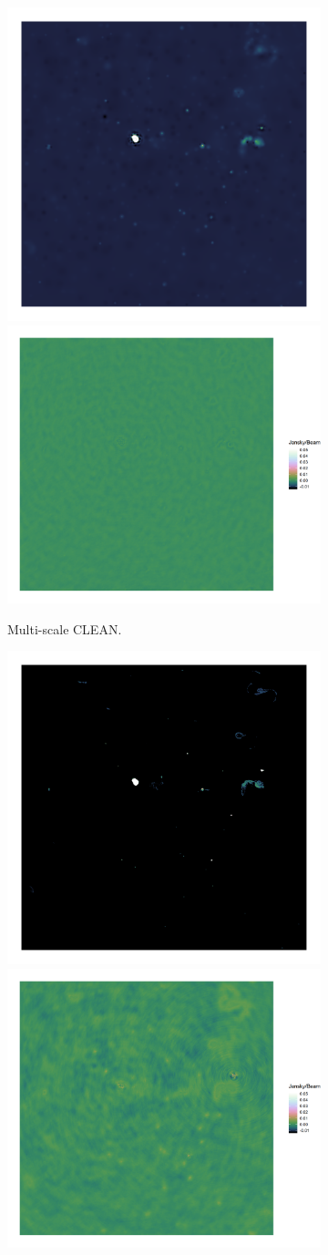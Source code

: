 \newpage

\begin{figure}[!htp]
	\centering
	\begin{subfigure}[b]{0.98\linewidth}
		\centering
		\includegraphics[width=0.412\linewidth, clip, trim={0.72in 0.72in 0.72in 0.72in}]{./chapters/10.results/MSClean/Natural-CLEAN.png}
		\includegraphics[width=0.490\linewidth, clip, trim={0.36in 0.36in 0.0in 0.36in}]{./chapters/10.results/MSClean/Natural-CLEAN-residuals.png}
		\caption{Multi-scale CLEAN.}
		\label{results:comp:clean}
	\end{subfigure}
	\begin{subfigure}[b]{0.98\linewidth}
		\centering
		\includegraphics[width=0.412\linewidth, clip, trim={0.72in 0.72in 0.72in 0.72in}]{./chapters/10.results/SerialCD/CD-reference.png}
		\includegraphics[width=0.490\linewidth, clip, trim={0.36in 0.36in 0.0in 0.36in}]{./chapters/10.results/SerialCD/CD-reference-residuals.png}

\end{subfigure}
\end{figure}
